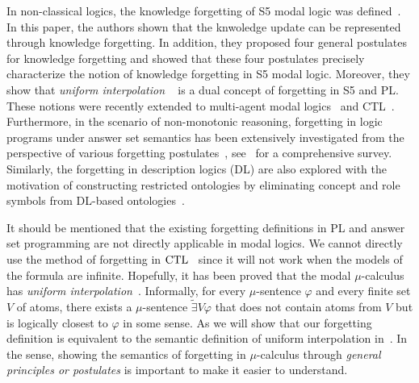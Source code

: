 \documentclass[runningheads]{llncs}
\begin{document}
In non-classical logics,
the knowledge forgetting of S5 modal logic was defined~\cite{Yan:AIJ:2009}.
In this paper, the authors shown that the knwoledge update can be represented through knowledge forgetting.
 In addition, they proposed four general postulates for knowledge forgetting and showed that these four postulates precisely characterize the notion of knowledge forgetting in S5 modal logic.
Moreover, they show that \emph{uniform interpolation} ~\cite{visser1996uniform} is a dual concept of forgetting in S5 and PL. 
 These notions were recently extended to multi-agent modal logics~\cite{fang2019forgetting} and CTL~\cite{feng2020sufficient}.
Furthermore, in the scenario of non-monotonic reasoning,  forgetting in logic programs under answer set semantics has been extensively investigated from the perspective of various forgetting postulates~\cite{DBLP:Zhang:AIJ2006,DBLP:journals/ai/EiterW08,Wong:PhD:Thesis,Yisong:JAIR,Yisong:IJCAI:2013,DBLP:journals/jair/Delgrande17,gonccalves2020limits}, see~\cite{eiter2019brief,gonccalves2021forgetting} for a comprehensive survey.
Similarly, the forgetting in description logics (DL) are also explored with the motivation of constructing restricted ontologies by eliminating concept and role symbols from DL-based
ontologies~\cite{Wang:AMAI:2010,Lutz:IJCAI:2011,Konev:JAIR:2012,Zhao:2017:IJCAI,DBLP:conf/aaai/ZhaoSWZF20}. 

It should be mentioned that the existing forgetting definitions in PL and answer set programming are not directly applicable in modal logics.
We cannot directly use the method of forgetting in $\textrm{CTL}$~\cite{renyansfirstpaper} since it will not work when the  models of the formula are infinite.
Hopefully, it has been proved that the modal $\mu$-calculus has \emph{uniform interpolation}~\cite{d1996uniform}. Informally, for every $\mu$-sentence $\varphi$ and every finite set $V$ of atoms, there exists a $\mu$-sentence $\widetilde{\exists}V \varphi$ that does not contain atoms from $V$ but is  logically closest to $\varphi$ in some sense. 
As we will show that our forgetting definition is equivalent to the semantic definition of uniform interpolation in~\cite{d1996uniform,d2006modal}.
In the sense, showing the semantics of forgetting in $\mu$-calculus through \emph{general principles or postulates} is important to make it easier to understand.
\end{document}
